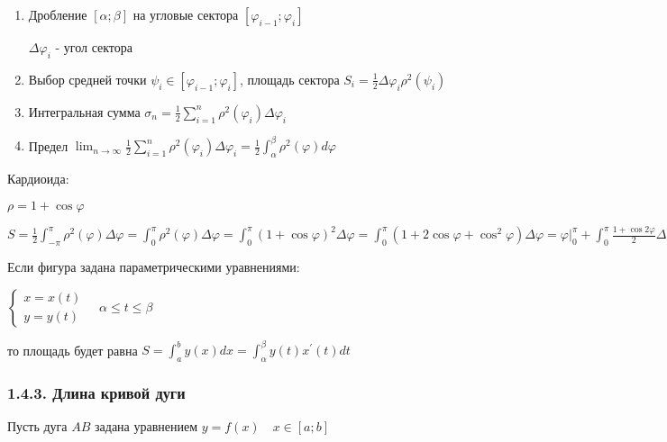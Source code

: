 \documentclass[12pt]{article}
\begin{document}
    \begin{enumerate}
        \item Дробление $[\alpha;\beta]$ на угловые сектора $[\varphi_{i - 1};\varphi_i]$

        $\Delta \varphi_i$ - угол сектора

        \item Выбор средней точки $\psi_i \in [\varphi_{i - 1};\varphi_i]$, площадь сектора $S_i = \frac{1}{2} \Delta \varphi_i \rho^2(\psi_i)$

        \item Интегральная сумма $\sigma_n = \frac{1}{2} \sum_{i=1}^n \rho^2 (\varphi_i) \Delta \varphi_i$

        \item Предел $\lim_{n \to \infty} \frac{1}{2} \sum_{i=1}^n \rho^2 (\varphi_i) \Delta \varphi_i = \frac{1}{2} \int_\alpha^\beta \rho^2(\varphi) d\varphi$
    \end{enumerate}

    \Ex Кардиоида:

    $\rho = 1 + \cos\varphi$

    $S = \frac{1}{2}\int^{\pi}_{-\pi} \rho^2 (\varphi) \Delta \varphi = \int_0^\pi \rho^2 (\varphi) \Delta \varphi =
    \int_0^\pi (1 + \cos\varphi)^2 \Delta \varphi = \int_0^\pi (1 + 2\cos\varphi + \cos^2\varphi) \Delta \varphi =
    \varphi \Big|_0^\pi + \int_0^\pi \frac{1 + \cos2\varphi}{2} \Delta \varphi = \pi + \frac{1}{2}\pi = \frac{3}{2}\pi$

    \Nota Если фигура задана параметрическими уравнениями:

    $\begin{cases}x = x(t) \\ y = y(t)\end{cases} \quad \alpha \leq t \leq \beta$

    то площадь будет равна $S = \int_a^b y(x)dx = \int^\beta_\alpha y(t)x^\prime(t)dt$

    \subsubsection{1.4.3. Длина кривой дуги}

    \hypertarget{lengthofarc}{Пусть дуга $AB$ задана уравнением $y = f(x) \quad x \in [a;b]$}
\end{document}
